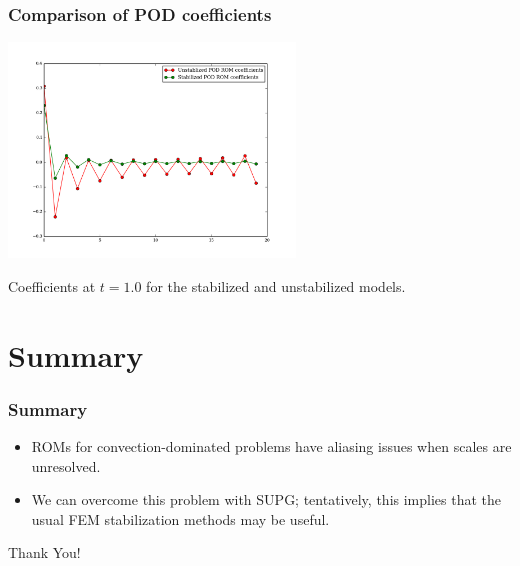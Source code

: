 \documentclass[8pt]{beamer}
\begin{document}
    \begin{frame}
        \frametitle{Comparison of POD coefficients}
        \begin{center}
            \includegraphics[width=3in]{Pictures/CDR/codina_rising_wave_coefficients_10.png}

            Coefficients at \(t = 1.0\) for the stabilized and unstabilized models.
        \end{center}
    \end{frame}

\section{Summary}
    \begin{frame}
        \frametitle{Summary}
        \begin{itemize}
            \item ROMs for convection-dominated problems have aliasing issues
                  when scales are unresolved.
            \item We can overcome this problem with SUPG; tentatively, this
                  implies that the usual FEM stabilization methods may be
                  useful.
        \end{itemize}
    \end{frame}

    \begin{frame}
        \begin{center}
            \textcolor{RPIred}{\Huge Thank You!}
        \end{center}
    \end{frame}


\begin{frame}[allowframebreaks]
    
    \tiny
    {
    
    }
\end{frame}
\end{document}
